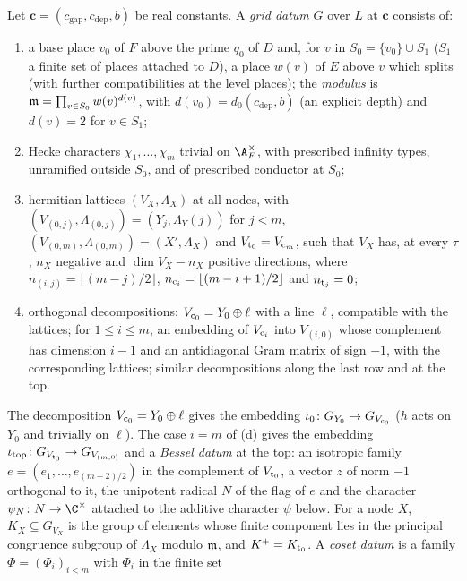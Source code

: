 \begin{definition}\label{pf:fs:grid}
Let $\mathbf c=(c_{\mathrm{gap}},c_{\mathrm{dep}},b)$ be real constants. A \emph{grid datum} $G$ over $L$ at $\mathbf c$
consists of:
\begin{enumerate}[label=(\alph*)]
\item a base place $v_0$ of $F$ above the prime $q_0$ of $D$ and, for $v$ in $S_0=\{v_0\}\cup S_1$ ($S_1$ a finite set of
places attached to $D$), a place $w(v)$ of $E$ above $v$ which splits (with further compatibilities at the level places);
the \emph{modulus} is $\mathfrak m=\prod_{v\in S_0}w(v)^{d(v)}$, with $d(v_0)=d_0(c_{\mathrm{dep}},b)$ (an explicit depth) and
$d(v)=2$ for $v\in S_1$;
\item Hecke characters $\chi_1,\dots,\chi_m$ trivial on $\A_F^\times$, with prescribed infinity types, unramified outside
$S_0$, and of prescribed conductor at $S_0$;
\item hermitian lattices $(V_X,\Lambda_X)$ at all nodes, with $(V_{(0,j)},\Lambda_{(0,j)})=(Y_j,\Lambda_Y(j))$ for $j<m$,
$(V_{(0,m)},\Lambda_{(0,m)})=(X',\Lambda_X)$ and $V_{\mathrm{t}_0}=V_{\mathrm{c}_m}$, such that $V_X$ has, at every $\tau$, $n_X$
negative and $\dim V_X-n_X$ positive directions, where
$n_{(i,j)}=\lfloor(m-j)/2\rfloor$, $n_{\mathrm{c}_i}=\lfloor(m-i+1)/2\rfloor$ and $n_{\mathrm{t}_j}=0$;
\item orthogonal decompositions: $V_{\mathrm{c}_0}=Y_0\oplus\ell$ with a line $\ell$, compatible with the lattices; for
$1\le i\le m$, an embedding of $V_{\mathrm{c}_i}$ into $V_{(i,0)}$ whose complement has dimension $i-1$ and an antidiagonal Gram
matrix of sign $-1$, with the corresponding lattices; similar decompositions along the last row and at the top.
\end{enumerate}
The decomposition $V_{\mathrm{c}_0}=Y_0\oplus\ell$ gives the embedding $\iota_0\colon G_{Y_0}\to G_{V_{\mathrm{c}_0}}$ ($h$ acts on $Y_0$ and
trivially on $\ell$). The case $i=m$ of (d) gives the embedding $\iota_{\mathrm{top}}\colon G_{V_{\mathrm{t}_0}}\to G_{V_{(m,0)}}$ and
a \emph{Bessel datum} at the top: an isotropic family $e=(e_1,\dots,e_{(m-2)/2})$ in the complement of $V_{\mathrm{t}_0}$, a vector
$z$ of norm $-1$ orthogonal to it, the unipotent radical $N$ of the flag of $e$ and the character
$\psi_N\colon N\to\C^\times$ attached to the additive character $\psi$ below. For a node $X$, $K_X\subseteq G_{V_X}$ is the
group of elements whose finite component lies in the principal congruence subgroup of $\Lambda_X$ modulo $\mathfrak m$, and
$K^+=K_{\mathrm{t}_0}$. A \emph{coset datum} is a family $\Phi=(\Phi_i)_{i<m}$ with $\Phi_i$ in the finite set

\end{definition}
